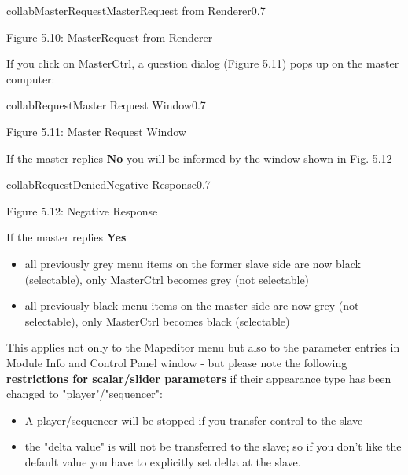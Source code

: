 \begin{covimg}{collab}{MasterRequest}{MasterRequest from Renderer}{0.7}\end{covimg}
\begin{htmlonly}
Figure 5.10: MasterRequest from Renderer
\vspace{0.5cm}
\end{htmlonly}
\clearpage

If you click on MasterCtrl, a question dialog (Figure 5.11) pops up on the master computer:

\begin{covimg}{collab}{Request}{Master Request Window}{0.7}\end{covimg}
\begin{htmlonly}
Figure 5.11: Master Request Window
\vspace{0.5cm}
\end{htmlonly}

If the master replies {\bf No} you will be informed by the window shown in Fig. 5.12

\begin{covimg}{collab}{RequestDenied}{Negative Response}{0.7}\end{covimg}
\begin{htmlonly}
Figure 5.12: Negative Response
\vspace{0.5cm}
\end{htmlonly}

If the master replies {\bf Yes}
\begin{itemize}
\item all previously grey menu items on the former slave side are now black (selectable), only MasterCtrl becomes grey (not
selectable)
\item all previously black menu items on the master side are now grey (not selectable), only MasterCtrl becomes black
(selectable)
\end{itemize}

This applies not only to the Mapeditor menu but also to the parameter entries
in Module Info and Control Panel window - but please note the following
{\bf restrictions for scalar/slider parameters} if their appearance type has been changed
to "player"/"sequencer":
\begin{itemize}
\item A player/sequencer will be stopped if you transfer control to the slave
\item the "delta value" is will not be transferred to the slave; so if you don't like the
default value you have to explicitly set delta at the slave.
\end{itemize}
\clearpage

